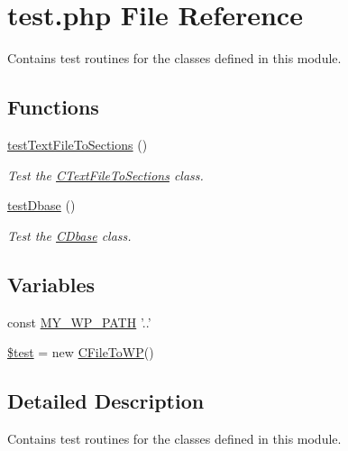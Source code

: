 \hypertarget{test_8php}{\section{test.\+php File Reference}
\label{test_8php}
}


Contains test routines for the classes defined in this module. \subsubsection*{} 


\subsection*{Functions}
\begin{DoxyCompactItemize}
\item 
\hyperlink{test_8php_a5d649a9d75b51a446faac025343c5686}{test\+Text\+File\+To\+Sections} ()
\begin{DoxyCompactList}\small\item\em Test the \hyperlink{class_c_text_file_to_sections}{C\+Text\+File\+To\+Sections} class. \end{DoxyCompactList}\item 
\hyperlink{test_8php_a1f7f30bf5f00e71ae65a6012df1379ee}{test\+Dbase} ()
\begin{DoxyCompactList}\small\item\em Test the \hyperlink{class_c_dbase}{C\+Dbase} class. \end{DoxyCompactList}\end{DoxyCompactItemize}
\subsection*{Variables}
\begin{DoxyCompactItemize}
\item 
const \hyperlink{test_8php_ab9655ee8f40d51ad76f2479000e8d41c}{M\+Y\+\_\+\+W\+P\+\_\+\+P\+A\+T\+H} '..'
\item 
\hyperlink{test_8php_a31daebf88fc668f410293e2c70cea3fc}{\$test} = new \hyperlink{class_c_file_to_w_p}{C\+File\+To\+W\+P}()
\end{DoxyCompactItemize}


\subsection{Detailed Description}
Contains test routines for the classes defined in this module. \subsubsection*{}



